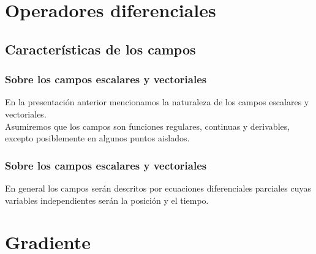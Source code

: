\documentclass[12pt]{beamer}
\begin{document}
\section{Operadores diferenciales}
\subsection{Características de los campos}
\begin{frame}
\frametitle{Sobre los campos escalares y vectoriales}
En la presentación anterior mencionamos la naturaleza de los campos escalares y vectoriales.
\\
\bigskip
\pause
Asumiremos que los campos son funciones regulares, continuas y derivables, excepto posiblemente en algunos puntos aislados.
\end{frame}
\begin{frame}
\frametitle{Sobre los campos escalares y vectoriales}
En general los campos serán descritos por ecuaciones diferenciales parciales cuyas variables independientes serán la posición y el tiempo.
\end{frame}
\section{Gradiente}
\end{document}

